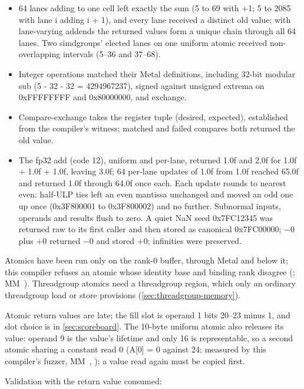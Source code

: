 \begin{itemize}
\item 64 lanes adding to one cell left exactly the sum (5 to 69 with +1; 5 to 2085 with lane i adding i + 1), and
  every lane received a distinct old value; with lane-varying addends the returned values form a unique chain through all
  64 lanes. Two simdgroups' elected lanes on one uniform atomic received non-overlapping intervals (5--36 and 37--68).
\item Integer operations matched their Metal definitions, including 32-bit modular sub (5 - 32 - 32 = 4294967237), signed against unsigned
  extrema on 0xFFFFFFFF and 0x80000000, and exchange.
\item Compare-exchange takes the register tuple (desired, expected), established from the compiler's witness; matched and
  failed compares both returned the old value.
\item The fp32 add (code 12), uniform and per-lane, returned 1.0f and 2.0f for 1.0f + 1.0f + 1.0f, leaving 3.0f; 64
  per-lane updates of 1.0f from 1.0f reached 65.0f and returned 1.0f through 64.0f once each. Each update rounds to
  nearest even: half-ULP ties left an even mantissa unchanged and moved an odd one up once (0x3F800001 to 0x3F800002) and
  no further. Subnormal inputs, operands and results flush to zero. A quiet NaN seed 0x7FC12345 was returned raw to its
  first caller and then stored as canonical 0x7FC00000; $-0$ plus $+0$ returned $-0$ and stored $+0$; infinities were preserved.
\end{itemize}

Atomics have been run only on the rank-0 buffer, through Metal and below it; this compiler refuses an
atomic whose identity base and binding rank disagree (; MM~). Threadgroup atomics need a
threadgroup region, which only an ordinary threadgroup load or store provisions (\cref{sec:threadgroup-memory}).

Atomic return values are late; the fill slot is operand 1 bits 20--23 minus 1, and slot choice is in \cref{sec:scoreboard}. The 10-byte uniform atomic also releases its value: operand 9 is the value's lifetime and only 16 is
representable, so a second atomic sharing a constant read 0 (A{[}0{]} = 0 against 24; measured by this compiler's fuzzer,
MM~, ); a value read again must be copied first.

Validation with the return value consumed:

